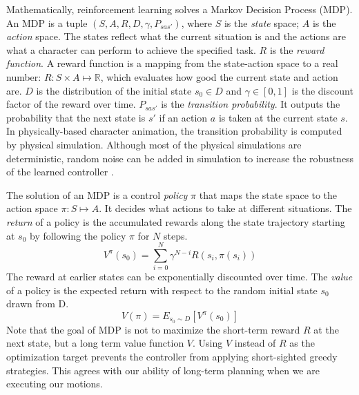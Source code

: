 Mathematically, reinforcement learning solves a Markov Decision Process (MDP). An MDP is a tuple $(S, A, R, D, \gamma, P_{sas'})$, where $S$ is the \emph{state} space; $A$ is the \emph{action} space. The states reflect what the current situation is and the actions are what a character can perform to achieve the specified task. $R$ is the \emph{reward function}. A reward function is a mapping from the state-action space to a real number: $R: S\times A\mapsto \mathbb{R}$, which evaluates how good the current state and action are. $D$ is the distribution of the initial state $s_0 \in D$ and $\gamma \in [0, 1]$ is the discount factor of the reward over time. $P_{sas'}$ is the \emph{transition probability}. It outputs the probability that the next state is $s'$ if an action $a$ is taken at the current state $s$. In physically-based character animation, the transition probability is computed by physical simulation. Although most of the physical simulations are deterministic, random noise can be added in simulation to increase the robustness of the learned controller \cite{Wang:2010}.

The solution of an MDP is a control \emph{policy} $\pi$ that maps the state space to the action space $\pi: S\mapsto A$. It decides what actions to take at different situations. The \emph{return} of a policy is the accumulated rewards along the state trajectory starting at $s_0$ by following the policy $\pi$ for $N$ steps.
\begin{displaymath}
V^\pi(s_0)=\sum_{i=0}^N{\gamma^{N-i}R(s_i, \pi(s_i))}
\end{displaymath}
The reward at earlier states can be exponentially discounted over time. The \emph{value} of a policy is the expected return with respect to the random initial state $s_0$ drawn from D.
\begin{equation}
V(\pi)=E_{s_0\sim D}[V^\pi(s_0)]
\label{eq:policyValue}
\end{equation}
Note that the goal of MDP is not to maximize the short-term reward $R$ at the next state, but a long term value function $V$. Using $V$ instead of $R$ as the optimization target prevents the controller from applying short-sighted greedy strategies. This agrees with our ability of long-term planning when we are executing our motions.

